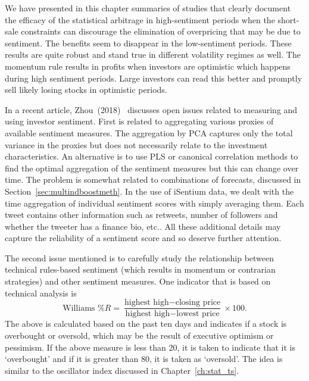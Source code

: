 We have presented in this chapter summaries of studies that clearly document the efficacy of the statistical arbitrage in high-sentiment periods when the short-sale constraints can discourage the elimination of overpricing that may be due to sentiment. The benefits seem to disappear in the low-sentiment periods. These results are quite robust and stand true in different volatility regimes as well. The momentum rule results in profits when investors are optimistic which happens during high sentiment periods. Large investors can read this better and promptly sell likely losing stocks in optimistic periods.


In a recent article, Zhou~(2018)~\cite{zhou18measure} discusses open issues related to measuring and using investor sentiment. First is related to aggregating various proxies of available sentiment measures. The aggregation by PCA captures only the total variance in the proxies but does not necessarily relate to the investment characteristics. An alternative is to use PLS or canonical correlation methods to find the optimal aggregation of the sentiment measures but this can change over time. The problem is somewhat related to combinations of forecasts, discussed in Section~\ref{sec:multindboostmeth}. In the use of iSentium data, we dealt with the time aggregation of individual sentiment scores with simply averaging them. Each tweet contains other information such as retweets, number of followers and whether the tweeter has a finance bio, etc.. All these additional details may capture the reliability of a sentiment score and so deserve further attention. 


The second issue mentioned is to carefully study the relationship between technical rules-based sentiment (which results in momentum or contrarian strategies) and other sentiment measures. One indicator that is based on technical analysis is
	\begin{equation}\label{eqn:williams}
	\text{Williams \% }R= \dfrac{\text{highest high}-\text{closing price}}{\text{highest high}-\text{lowest price}} \times 100.
	\end{equation}
The above is calculated based on the past ten days and indicates if a stock is overbought or oversold, which may be the result of executive optimism or pessimism. If the above measure is less than 20, it is taken to indicate that it is `overbought' and if it is greater than 80, it is taken as `oversold'. The idea is similar to the oscillator index discussed in Chapter~\ref{ch:stat_ts}. 


